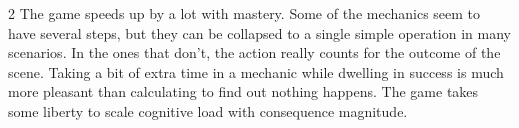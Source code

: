 \begin{multicols}{2}
The game speeds up by a lot with mastery. Some of the mechanics seem to have several steps, but they can be collapsed to a single simple operation in many scenarios. In the ones that don't, the action really counts for the outcome of the scene. Taking a bit of extra time in a mechanic while dwelling in success is much more pleasant than calculating to find out nothing happens. The game takes some liberty to scale cognitive load with consequence magnitude.








\end{multicols}